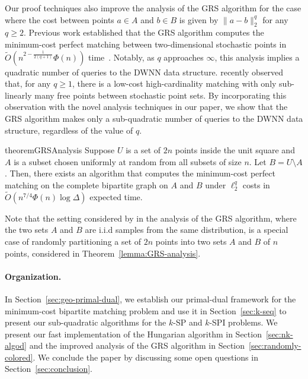 \documentclass[11pt,onecolumn]{article}
\begin{document}
%
 

%
%

%

Our proof techniques also improve the analysis of the GRS algorithm for the case where the cost between points $a \in A$ and $b \in B$ is given by $\|a-b\|_2^q$ for any $q \ge 2$. Previous work established that the GRS algorithm computes the minimum-cost perfect matching between two-dimensional stochastic points in $\tilde{O}(n^{2-\frac{1}{2(q+1)}}\Phi(n))$ time~\cite{gattani2023robust}. Notably, as $q$ approaches $\infty$, this analysis implies a quadratic number of queries to the DWNN data structure.
\citet{raghvendra2024new} recently observed that, for any $q\ge1$, there is a low-cost high-cardinality matching with only sub-linearly many free points between stochastic point sets. By incorporating this observation with the novel analysis techniques in our paper, we show that the GRS algorithm makes only a sub-quadratic number of queries to the DWNN data structure, regardless of the value of $q$. 
  
%

\begin{restatable}{theorem}{GRSAnalysis}\label{lemma:GRS-analysis}
    Suppose $U$ is a set of $2n$ points inside the unit square and $A$ is a subset chosen uniformly at random from all subsets of size $n$. Let $B=U\setminus A$.  Then, there exists an algorithm that computes the minimum-cost perfect matching on the complete bipartite graph on $A$ and $B$ under $\ell_2^q$ costs in $\tilde{O}(n^{7/4}\Phi(n)\log \Delta)$ expected time.
\end{restatable}

Note that the setting considered by \citet{gattani2023robust} in the analysis of the GRS algorithm, where the two sets $A$ and $B$ are i.i.d samples from the same distribution, is a special case of randomly partitioning a set of $2n$ points into two sets $A$ and $B$ of $n$ points, considered in Theorem~\ref{lemma:GRS-analysis}.


%

%


%



\paragraph{Organization.} In Section~\ref{sec:geo-primal-dual}, we establish our primal-dual framework for the minimum-cost bipartite matching problem and use it in Section~\ref{sec:k-seq} to present our sub-quadratic algorithms for the $k$-SP and $k$-SPI problems. We present our fast implementation of the Hungarian algorithm in Section~\ref{sec:nk-algod} and the improved analysis of the GRS algorithm in Section~\ref{sec:randomly-colored}. We conclude the paper by discussing some open questions in Section~\ref{sec:conclusion}.
\end{document}
